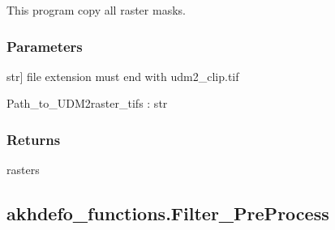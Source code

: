 \documentclass[letterpaper,10pt]{sphinxmanual}
\begin{document}
\begin{fulllineitems}
\label{\detokenize{generated/akhdefo_functions.copyUDM2_Mask_Data:akhdefo_functions.copyUDM2_Mask_Data}}
\pysigstartsignatures
{}
\pysigstopsignatures
\sphinxAtStartPar
This program copy all  raster masks.


\subsubsection{Parameters}
\label{\detokenize{generated/akhdefo_functions.copyUDM2_Mask_Data:parameters}}\begin{description}
\sphinxlineitem{path\_to\_unzipped\_folders}{[}str{]}
\sphinxAtStartPar
file extension must end with udm2\_clip.tif

\end{description}

\sphinxAtStartPar
Path\_to\_UDM2raster\_tifs : str


\subsubsection{Returns}
\label{\detokenize{generated/akhdefo_functions.copyUDM2_Mask_Data:returns}}
\sphinxAtStartPar
rasters

\end{fulllineitems}


\sphinxstepscope


\subsection{akhdefo\_functions.Filter\_PreProcess}
\label{\detokenize{generated/akhdefo_functions.Filter_PreProcess:akhdefo-functions-filter-preprocess}}\label{\detokenize{generated/akhdefo_functions.Filter_PreProcess::doc}}
\end{document}
